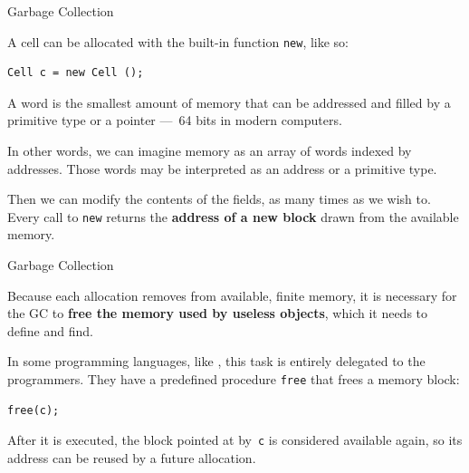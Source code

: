\documentclass[compress,dvipdfmx]{beamer}
\begin{document}
%
\begin{frame}[fragile]{Garbage Collection}

  A cell can be allocated with the built-in function \texttt{new},
  like so:
\begin{verbatim}
Cell c = new Cell ();
\end{verbatim}

A word is the smallest amount of memory that can be
addressed and filled by a primitive type or a pointer ---~64
bits in modern computers.

\bigskip

In other words, we can imagine memory as an array of words indexed by
addresses. Those words may be interpreted as an address or a primitive
type.

\bigskip

Then we can modify the contents of the fields, as many times as we
wish to. Every call to \texttt{new} returns the \textbf{address of a
  new block} drawn from the available memory.

\end{frame}

%
\begin{frame}[fragile]{Garbage Collection}

Because each allocation removes from available, finite memory, it is
necessary for the GC to \textbf{free the memory used by useless
  objects}, which it needs to define and find.

\bigskip

In some programming languages, like \C, this task is entirely
delegated to the programmers. They have a predefined procedure
\texttt{free} that frees a memory block:
\begin{verbatim}
free(c);
\end{verbatim}
After it is executed, the block pointed at by~\texttt{c} is
considered available again, so its address can be reused by a future
allocation.

\end{frame}
\end{document}
